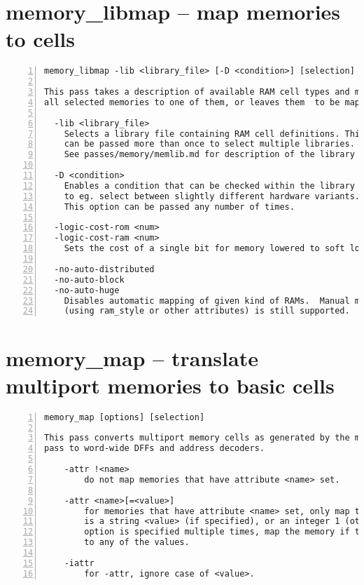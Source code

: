 \section{memory\_libmap -- map memories to cells}
\label{cmd:memory_libmap}
\begin{lstlisting}[numbers=left,frame=single]
    memory_libmap -lib <library_file> [-D <condition>] [selection]

This pass takes a description of available RAM cell types and maps
all selected memories to one of them, or leaves them  to be mapped to FFs.

  -lib <library_file>
    Selects a library file containing RAM cell definitions. This option
    can be passed more than once to select multiple libraries.
    See passes/memory/memlib.md for description of the library format.

  -D <condition>
    Enables a condition that can be checked within the library file
    to eg. select between slightly different hardware variants.
    This option can be passed any number of times.

  -logic-cost-rom <num>
  -logic-cost-ram <num>
    Sets the cost of a single bit for memory lowered to soft logic.

  -no-auto-distributed
  -no-auto-block
  -no-auto-huge
    Disables automatic mapping of given kind of RAMs.  Manual mapping
    (using ram_style or other attributes) is still supported.
\end{lstlisting}

\section{memory\_map -- translate multiport memories to basic cells}
\label{cmd:memory_map}
\begin{lstlisting}[numbers=left,frame=single]
    memory_map [options] [selection]

This pass converts multiport memory cells as generated by the memory_collect
pass to word-wide DFFs and address decoders.

    -attr !<name>
        do not map memories that have attribute <name> set.

    -attr <name>[=<value>]
        for memories that have attribute <name> set, only map them if its value
        is a string <value> (if specified), or an integer 1 (otherwise). if this
        option is specified multiple times, map the memory if the attribute is
        to any of the values.

    -iattr
        for -attr, ignore case of <value>.
\end{lstlisting}

